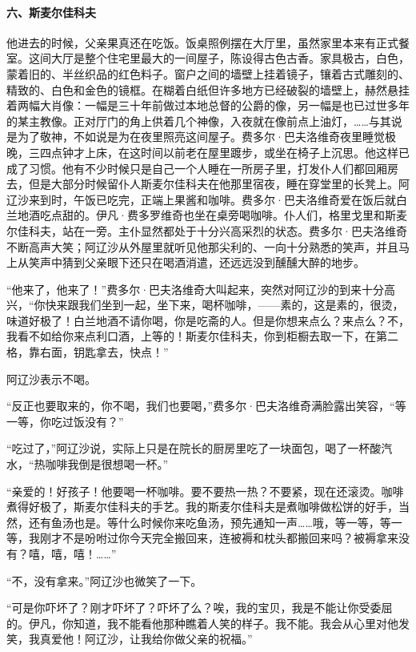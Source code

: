 \paragraph*{六、斯麦尔佳科夫}
\par 他进去的时候，父亲果真还在吃饭。饭桌照例摆在大厅里，虽然家里本来有正式餐室。这间大厅是整个住宅里最大的一间屋子，陈设得古色古香。家具极古，白色，蒙着旧的、半丝织品的红色料子。窗户之间的墙壁上挂着镜子，镶着古式雕刻的、精致的、白色和金色的镜框。在糊着白纸但许多地方已经破裂的墙壁上，赫然悬挂着两幅大肖像：一幅是三十年前做过本地总督的公爵的像，另一幅是也已过世多年的某主教像。正对厅门的角上供着几个神像，入夜就在像前点上油灯，……与其说是为了敬神，不如说是为在夜里照亮这间屋子。费多尔·巴夫洛维奇夜里睡觉极晚，三四点钟才上床，在这时间以前老在屋里踱步，或坐在椅子上沉思。他这样已成了习惯。他有不少时候只是自己一个人睡在一所房子里，打发仆人们都回厢房去，但是大部分时候留仆人斯麦尔佳科夫在他那里宿夜，睡在穿堂里的长凳上。阿辽沙来到时，午饭已吃完，正端上果酱和咖啡。费多尔·巴夫洛维奇爱在饭后就白兰地酒吃点甜的。伊凡·费多罗维奇也坐在桌旁喝咖啡。仆人们，格里戈里和斯麦尔佳科夫，站在一旁。主仆显然都处于十分兴高采烈的状态。费多尔·巴夫洛维奇不断高声大笑；阿辽沙从外屋里就听见他那尖利的、一向十分熟悉的笑声，并且马上从笑声中猜到父亲眼下还只在喝酒消遣，还远远没到醺醺大醉的地步。
\par “他来了，他来了！”费多尔·巴夫洛维奇大叫起来，突然对阿辽沙的到来十分高兴，“你快来跟我们坐到一起，坐下来，喝杯咖啡，——素的，这是素的，很烫，味道好极了！白兰地酒不请你喝，你是吃斋的人。但是你想来点么？来点么？不，我看不如给你来点利口酒，上等的！斯麦尔佳科夫，你到柜橱去取一下，在第二格，靠右面，钥匙拿去，快点！”
\par 阿辽沙表示不喝。
\par “反正也要取来的，你不喝，我们也要喝，”费多尔·巴夫洛维奇满脸露出笑容，“等一等，你吃过饭没有？”
\par “吃过了，”阿辽沙说，实际上只是在院长的厨房里吃了一块面包，喝了一杯酸汽水，“热咖啡我倒是很想喝一杯。”
\par “亲爱的！好孩子！他要喝一杯咖啡。要不要热一热？不要紧，现在还滚烫。咖啡煮得好极了，斯麦尔佳科夫的手艺。我的斯麦尔佳科夫是煮咖啡做松饼的好手，当然，还有鱼汤也是。等什么时候你来吃鱼汤，预先通知一声……哦，等一等，等一等，我刚才不是吩咐过你今天完全搬回来，连被褥和枕头都搬回来吗？被褥拿来没有？嘻，嘻，嘻！……”
\par “不，没有拿来。”阿辽沙也微笑了一下。
\par “可是你吓坏了？刚才吓坏了？吓坏了么？唉，我的宝贝，我是不能让你受委屈的。伊凡，你知道，我不能看他那种瞧着人笑的样子。我不能。我会从心里对他发笑，我真爱他！阿辽沙，让我给你做父亲的祝福。”
